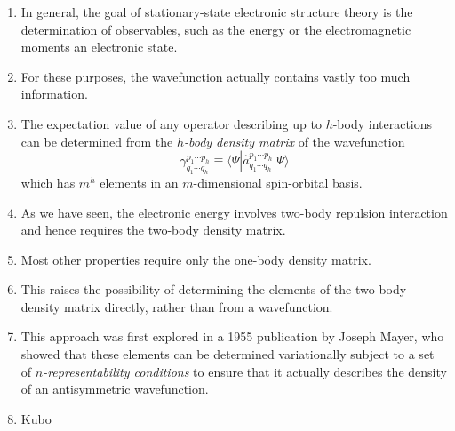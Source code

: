 \begin{enumerate}
    \item
        In general, the goal of stationary-state electronic structure theory is
        the determination of observables, such as the energy or the
        electromagnetic moments an electronic state.
    \item
        For these purposes, the wavefunction actually contains vastly too much
        information.
    \item
        The expectation value of any operator describing up to \(h\)-body
        interactions can be determined from the {\itshape \(h\)-body
        density matrix} of the wavefunction
        \begin{equation}
            \gamma^{p_1\cdots p_h}_{q_1\cdots q_h}
            \equiv
            \langle\Psi|\hat{a}^{p_1\cdots p_h}_{q_1\cdots q_h}|\Psi\rangle
        \end{equation}
        which has \(m^h\) elements in an \(m\)-dimensional spin-orbital basis.
    \item
        As we have seen, the electronic energy involves two-body repulsion
        interaction and hence requires the two-body density matrix.
    \item
        Most other properties require only the one-body density matrix.
    \item
        This raises the possibility of determining the elements of the two-body
        density matrix directly, rather than from a wavefunction.
    \item
        This approach was first explored in a 1955 publication by Joseph
        Mayer,\cite{Mayer:1955p1579} who showed that these elements can be
        determined variationally subject to a set of {\itshape
        \(n\)-representability conditions} to ensure that it actually describes
        the density of an antisymmetric wavefunction.
    \item
        Kubo\cite{Kubo:1962p1100}
\end{enumerate}

